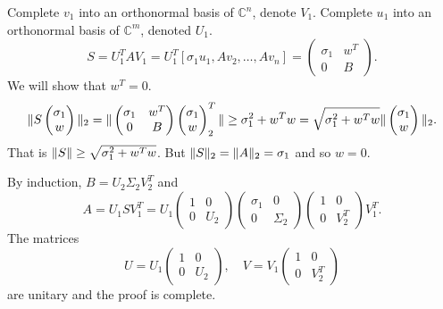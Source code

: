 \documentclass{article}
\begin{document}
Complete $v_{1}$ into an orthonormal basis of $\mathbb{C}^{n}$,
denote $V_{1}$. Complete $u_{1}$ into an orthonormal basis of
$\mathbb{C}^{m}$, denoted $U_{1}$.
\begin{equation*}
S = U_{1}^{T} A V_{1}  = U_{1}^{T} \left [ \sigma_{1}u_{1} , A
v_{2}, \ldots, A v_{n}\right ] =
\begin{pmatrix}
\sigma_{1} & w^{T}  \\
0 & B
\end{pmatrix}.
\end{equation*}
We will show that $w^{T}=0$.
\begin{equation*}
\| S \begin{pmatrix} \sigma_{1} \\ w \end{pmatrix} \|_{2} =  
\| 
\begin{pmatrix}
\sigma_{1} & w^{T}  \\
0 & B
\end{pmatrix}
\begin{pmatrix}
\sigma_{1} \\ w
\end{pmatrix}
^{T}_{2} \|
\ge \sigma_{1}^{2} + w^{T}w = \sqrt{\sigma_{1}^{2}+w^{T}w}
\| \begin{pmatrix} \sigma_{1} \\ w \end{pmatrix}  \|_{2}.
\end{equation*}
That is $\| S \| \ge \sqrt{\sigma_{1}^{2} + w^{T}w}$. But
$\| S \|_{2} = \| A \|_{2}=\sigma_{1}$ and so $w=0$.

By induction, $B=U_{2}\Sigma_{2}V_{2}^{T}$ and
\begin{equation*}
A = U_{1}SV_{1}^{T} = U_{1}
\begin{pmatrix}
1 & 0 \\
0 & U_{2}
\end{pmatrix}
\begin{pmatrix}
\sigma_{1} & 0 \\
0 & \Sigma_{2}
\end{pmatrix}
\begin{pmatrix}
1 & 0 \\
0 & V_{2}^{T}
\end{pmatrix}
V_{1}^{T}.
\end{equation*}
The matrices
\begin{equation*}
U=U_{1}
\begin{pmatrix}
1 & 0 \\
0 & U_{2}
\end{pmatrix}, \quad
V=V_{1} \begin{pmatrix}
1 & 0 \\
0 & V_{2}^{T}
\end{pmatrix}
\end{equation*}
are unitary and the proof is complete.
\end{document}
